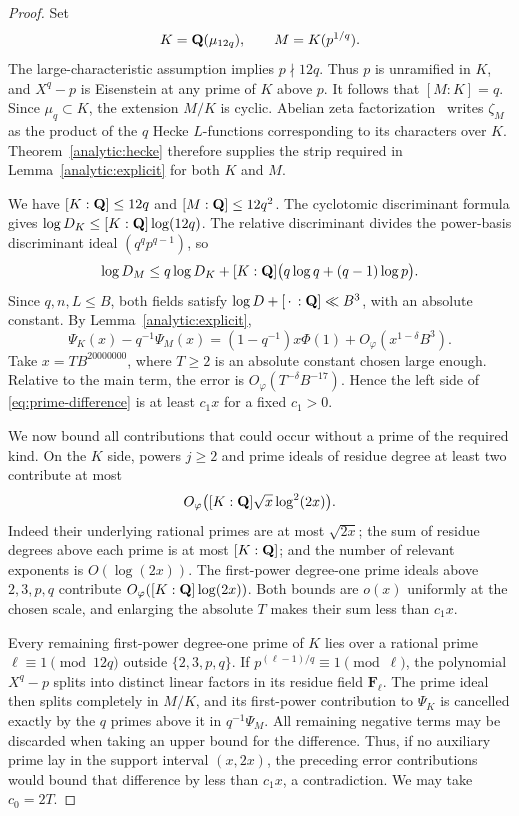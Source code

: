 \begin{proof}
Set
\[
 K=\mathbf Q(\mu_{12q}),\qquad M=K(p^{1/q}).
\]
The large-characteristic assumption implies $p\nmid12q$. Thus $p$
is unramified in $K$, and $X^q-p$ is Eisenstein at any prime of $K$
above $p$. It follows that $[M:K]=q$. Since $\mu_q\subset K$, the
extension $M/K$ is cyclic. Abelian zeta factorization~\cite[Chapter~VII]{Neukirch99} writes $\zeta_M$
as the product of the $q$ Hecke $L$-functions corresponding to its
characters over $K$. Theorem~\ref{analytic:hecke} therefore supplies the
strip required in Lemma~\ref{analytic:explicit} for both $K$ and $M$.

We have $[K:\mathbf Q]\le12q$ and $[M:\mathbf Q]\le12q^2$. The cyclotomic
discriminant formula gives
$\log D_K\le[K:\mathbf Q]\log(12q)$. The relative discriminant divides
the power-basis discriminant ideal $(q^qp^{q-1})$, so
\[
 \log D_M\le q\log D_K+
 [K:\mathbf Q]\bigl(q\log q+(q-1)\log p\bigr).
\]
Since $q,n,L\le B$, both fields satisfy
$\log D+[\,\cdot\,:\mathbf Q]\ll B^3$, with an absolute constant.
By Lemma~\ref{analytic:explicit},
\begin{equation}\label{eq:prime-difference}
 \Psi_K(x)-q^{-1}\Psi_M(x)
  =(1-q^{-1})x\Phi(1)+O_\varphi(x^{1-\delta}B^3).
\end{equation}
Take $x=T B^{20000000}$, where $T\ge2$ is an absolute constant chosen
large enough. Relative to the main term, the error is
$O_\varphi(T^{-\delta}B^{-17})$. Hence the left side of
\eqref{eq:prime-difference} is at least $c_1x$ for a fixed $c_1>0$.

We now bound all contributions that could occur without a prime of
the required kind. On the $K$ side, powers $j\ge2$ and prime ideals
of residue degree at least two contribute at most
\[
 O_\varphi\bigl([K:\mathbf Q]\sqrt{x}\log^2(2x)\bigr).
\]
Indeed their underlying rational primes are at most $\sqrt{2x}$;
the sum of residue degrees above each prime is at most $[K:\mathbf Q]$;
and the number of relevant exponents is $O(\log(2x))$. The
first-power degree-one prime ideals above $2,3,p,q$ contribute
$O_\varphi([K:\mathbf Q]\log(2x))$. Both bounds are $o(x)$ uniformly
at the chosen scale, and enlarging the absolute $T$ makes their sum
less than $c_1x$.

Every remaining first-power degree-one prime of $K$ lies over a
rational prime $\ell\equiv1\pmod{12q}$ outside $\{2,3,p,q\}$.
If $p^{(\ell-1)/q}\equiv1\pmod\ell$, the polynomial $X^q-p$
splits into distinct linear factors in its residue field
$\mathbf F_\ell$. The prime ideal then splits completely in $M/K$,
and its first-power contribution to $\Psi_K$ is cancelled exactly
by the $q$ primes above it in $q^{-1}\Psi_M$. All remaining negative
terms may be discarded when taking an upper bound for the difference.
Thus, if no auxiliary prime lay in the support interval $(x,2x)$,
the preceding error contributions would bound that difference by
less than $c_1x$, a contradiction. We may take $c_0=2T$.
\end{proof}

